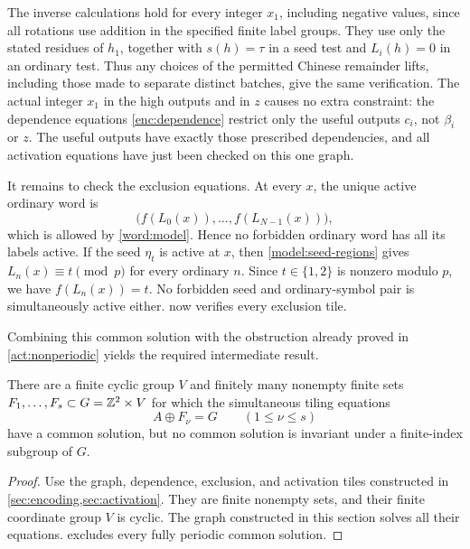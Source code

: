 The inverse calculations hold for every integer $x_1$, including
negative values, since all rotations use addition in the specified
finite label groups.  They use only the stated residues of $h_1$,
together with $s(h)=\tau$ in a seed test and $L_i(h)=0$ in an ordinary
test.  Thus any choices of the permitted Chinese remainder lifts,
including those made to separate distinct batches, give the same
verification.  The actual integer $x_1$ in the high outputs and in
$z$ causes no extra constraint: the dependence equations
\eqref{enc:dependence} restrict only the useful outputs $c_i$, not
$\beta_i$ or $z$.  The useful outputs have exactly those prescribed
dependencies, and all activation equations have just been checked
on this one graph.

It remains to check the exclusion equations.  At every $x$, the
unique active ordinary word is
\[
 \bigl(f(L_0(x)),\ldots,f(L_{N-1}(x))\bigr),
\]
which is allowed by \cref{word:model}.  Hence no forbidden ordinary
word has all its labels active.  If the seed $\eta_t$ is active at
$x$, then \eqref{model:seed-regions} gives
$L_n(x)\equiv t\pmod p$ for every ordinary $n$.  Since $t\in\{1,2\}$
is nonzero modulo $p$, we have $f(L_n(x))=t$.  No forbidden seed and
ordinary-symbol pair is simultaneously active either.
 now verifies every exclusion tile.

Combining this common solution with the obstruction already proved
in \cref{act:nonperiodic} yields the required intermediate result.

\begin{theorem}\label{model:system}
There are a finite cyclic group $V$ and finitely many nonempty finite
sets $F_1,\ldots,F_s\subset G=\mathbb Z^2\times V$ for which the simultaneous
tiling equations
\[
 A\oplus F_\nu=G\qquad(1\leq\nu\leq s)
\]
have a common solution, but no common solution is invariant under a
finite-index subgroup of $G$.
\end{theorem}

\begin{proof}
Use the graph, dependence, exclusion, and activation tiles
constructed in \cref{sec:encoding,sec:activation}.  They are finite
nonempty sets, and their finite coordinate group $V$ is cyclic.
The graph constructed in this section solves all their equations.
 excludes every fully periodic common solution.
\end{proof}
